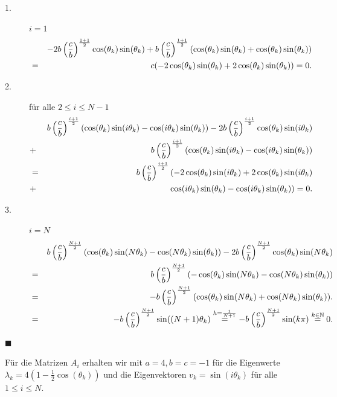 \begin{description}
\item[1.] $i = 1$
\begin{eqnarray}
&& -2b\left(\frac{c}{b}\right)^{\frac{1+1}{2}} \cos(\theta_{k})\sin(\theta_{k}) + b \left(\frac{c}{b}\right)^{\frac{1+1}{2}} (\cos(\theta_{k}) \sin(\theta_{k}) + \cos(\theta_{k}) \sin(\theta_{k})) \notag \\
&=& c (-2\cos(\theta_{k})\sin(\theta_{k}) + 2\cos(\theta_{k})\sin(\theta_{k})) = 0. \notag
\end{eqnarray}
\item[2.] für alle $2 \le i \le N-1$
\begin{eqnarray}
&& b \left(\frac{c}{b}\right)^{\frac{i+1}{2}} (\cos(\theta_{k}) \sin(i \theta_{k}) - \cos(i \theta_{k}) \sin(\theta_{k})) - 2b\left(\frac{c}{b}\right)^{\frac{i+1}{2}} \cos(\theta_{k})\sin(i \theta_{k}) \notag \\
&+& b \left(\frac{c}{b}\right)^{\frac{i+1}{2}} (\cos(\theta_{k}) \sin(i \theta_{k}) - \cos(i \theta_{k}) \sin(\theta_{k})) \notag \\
&=& b \left(\frac{c}{b}\right)^{\frac{i+1}{2}} (-2\cos(\theta_{k})\sin(i\theta_{k}) + 2\cos(\theta_{k})\sin(i\theta_{k}) \notag \\
&+& \cos(i\theta_{k})\sin(\theta_{k}) - \cos(i\theta_{k})\sin(\theta_{k})) = 0. \notag
\end{eqnarray}
\item[3.] $i = N$
\begin{eqnarray}
&& b \left(\frac{c}{b}\right)^{\frac{N+1}{2}} (\cos(\theta_{k}) \sin(N \theta_{k}) - \cos(N \theta_{k}) \sin(\theta_{k})) - 2b\left(\frac{c}{b}\right)^{\frac{N+1}{2}} \cos(\theta_{k})\sin(N \theta_{k}) \notag \\
&=& b \left(\frac{c}{b}\right)^{\frac{N+1}{2}}(-\cos(\theta_{k})\sin(N\theta_{k}) - \cos(N\theta_{k})\sin(\theta_{k})) \notag \\
&=& -b \left(\frac{c}{b}\right)^{\frac{N+1}{2}}(\cos(\theta_{k})\sin(N\theta_{k}) + \cos(N\theta_{k})\sin(\theta_{k})). \notag \\
&=& -b \left(\frac{c}{b}\right)^{\frac{N+1}{2}} \sin((N+1)\theta_{k}) \overset{h = \frac{1}{N+1}}{=} -b \left(\frac{c}{b}\right)^{\frac{N+1}{2}} \sin(k\pi) \overset{k \in \mathbb{N}}{=} 0. \notag
\end{eqnarray}
\end{description}
\begin{flushright}
$\blacksquare$
\end{flushright}
Für die Matrizen $A_{i}$ erhalten wir mit $a = 4, b = c = -1$ für die Eigenwerte $\lambda_{k} = 4 (1 - \frac{1}{2} \cos(\theta_{k}))$ und die Eigenvektoren $v_{k} = \sin(i\theta_{k})$ für alle $1 \le i \le N$.\\
